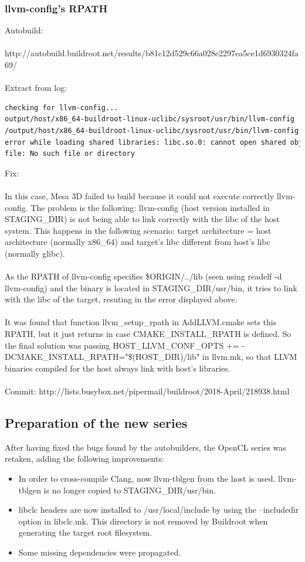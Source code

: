 \documentclass[12pt,a4paper,oneside]{article}
\begin{document}
\subsubsection*{llvm-config's RPATH}
Autobuild:\\\\
http://autobuild.buildroot.net/results/b81c12d529c66a028e2297ea5ce1d6930324fa69/\\\\
Extract from log:
\begin{lstlisting}[language=sh,keywords={}]
checking for llvm-config...
output/host/x86_64-buildroot-linux-uclibc/sysroot/usr/bin/llvm-config
/output/host/x86_64-buildroot-linux-uclibc/sysroot/usr/bin/llvm-config:
error while loading shared libraries: libc.so.0: cannot open shared object
file: No such file or directory
\end{lstlisting}
Fix:\\\\
In this case, Mesa 3D failed to build because it could not execute correctly
llvm-config. The problem is the following: llvm-config (host version installed in
STAGING\_DIR) is not being able to link correctly with the libc of the host system.
This happens in the following scenario: target architecture = host architecture
(normally x86\_64) and target's libc different from host's libc (normally glibc).\\\\
As the RPATH of llvm-config specifies \$ORIGIN/../lib (seen using readelf -d
llvm-config) and the binary is located in STAGING\_DIR/usr/bin, it tries to link
with the libc of the target, resuting in the error displayed above.\\\\
It was found that function {\selectfont llvm\_setup\_rpath} in
AddLLVM.cmake sets this RPATH, but it just returns in case CMAKE\_INSTALL\_RPATH
is defined. So the final solution was passing HOST\_LLVM\_CONF\_OPTS += -DCMAKE\_INSTALL\_RPATH="\$(HOST\_DIR)/lib"
in llvm.mk, so that LLVM binaries compiled for the host always link with host's
libraries.\\\\
Commit: http://lists.busybox.net/pipermail/buildroot/2018-April/218938.html

\subsection*{Preparation of the new series}
After having fixed the bugs found by the autobuilders, the OpenCL series was
retaken, adding the following improvements:
\begin{itemize}
  \item In order to cross-compile Clang, now llvm-tblgen from the host is used.
  llvm-tblgen is no longer copied to STAGING\_DIR/usr/bin.
  \item libclc headers are now installed to /usr/local/include by using the
  --includedir option in libclc.mk. This directory is not removed by Buildroot
  when generating the target root filesystem.
  \item Some missing dependencies were propagated.
\end{itemize}
\newpage
\end{document}
